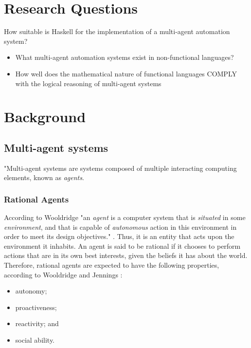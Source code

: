 \documentclass{sig-alternate-br}
\begin{document}
\section{Research Questions}
How suitable is Haskell for the implementation of a multi-agent automation system?
\begin{itemize}
\item What multi-agent automation systems exist in non-functional languages?
\item How well does the mathematical nature of functional languages COMPLY with the logical reasoning of multi-agent systems
\end{itemize}


\section{Background}
\subsection{Multi-agent systems}
"Multi-agent systems are systems composed of multiple interacting computing elements, known as {\it agents}.
\subsubsection{Rational Agents}
According to Wooldridge "an {\it agent} is a computer system that is {\it situated} in some {\it environment}, and that is capable of {\it autonomous} action in this environment in order to meet its design objectives." \cite{b:mas}. Thus, it is an entity that acts upon the environment it inhabits. An agent is said to be rational if it chooses to perform actions that are in its own best interests, given the beliefs it has about the world. Therefore, rational agents are expected to have the following properties, according to Wooldridge and Jennings \cite{b:rara}:
\begin{itemize}
\item autonomy;
\item proactiveness;
\item reactivity; and
\item social ability.
\end{itemize}
\end{document}
